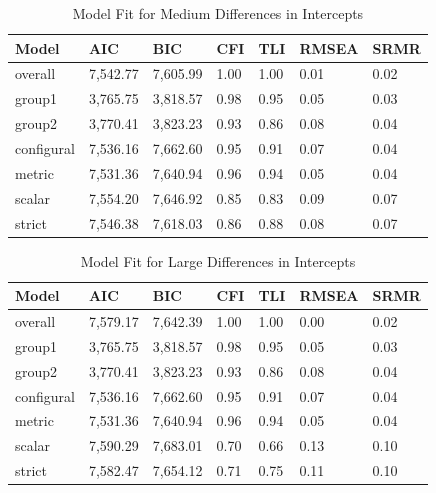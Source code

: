 \documentclass[
  man]{apa6}
\begin{document}
\begin{table}[tbp]

\begin{center}
\begin{threeparttable}

\caption{\label{tab:tab6}Model Fit for Medium Differences in Intercepts}

\begin{tabular}{lllllll}
\toprule
Model & AIC & BIC & CFI & TLI & RMSEA & SRMR\\
\midrule
overall & 7,542.77 & 7,605.99 & 1.00 & 1.00 & 0.01 & 0.02\\
group1 & 3,765.75 & 3,818.57 & 0.98 & 0.95 & 0.05 & 0.03\\
group2 & 3,770.41 & 3,823.23 & 0.93 & 0.86 & 0.08 & 0.04\\
configural & 7,536.16 & 7,662.60 & 0.95 & 0.91 & 0.07 & 0.04\\
metric & 7,531.36 & 7,640.94 & 0.96 & 0.94 & 0.05 & 0.04\\
scalar & 7,554.20 & 7,646.92 & 0.85 & 0.83 & 0.09 & 0.07\\
strict & 7,546.38 & 7,618.03 & 0.86 & 0.88 & 0.08 & 0.07\\
\bottomrule
\end{tabular}

\end{threeparttable}
\end{center}

\end{table}

\begin{table}[tbp]

\begin{center}
\begin{threeparttable}

\caption{\label{tab:tab7}Model Fit for Large Differences in Intercepts}

\begin{tabular}{lllllll}
\toprule
Model & AIC & BIC & CFI & TLI & RMSEA & SRMR\\
\midrule
overall & 7,579.17 & 7,642.39 & 1.00 & 1.00 & 0.00 & 0.02\\
group1 & 3,765.75 & 3,818.57 & 0.98 & 0.95 & 0.05 & 0.03\\
group2 & 3,770.41 & 3,823.23 & 0.93 & 0.86 & 0.08 & 0.04\\
configural & 7,536.16 & 7,662.60 & 0.95 & 0.91 & 0.07 & 0.04\\
metric & 7,531.36 & 7,640.94 & 0.96 & 0.94 & 0.05 & 0.04\\
scalar & 7,590.29 & 7,683.01 & 0.70 & 0.66 & 0.13 & 0.10\\
strict & 7,582.47 & 7,654.12 & 0.71 & 0.75 & 0.11 & 0.10\\
\bottomrule
\end{tabular}

\end{threeparttable}
\end{center}

\end{table}
\end{document}
